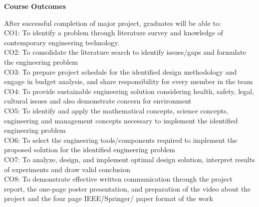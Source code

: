 \begin{titlepage}
\begin{center}
{\Large \textbf{Course Outcomes}}
\end{center}
After successful completion of major project, graduates will be able  to:\\
CO1: To identify a problem through literature survey and knowledge of contemporary engineering technology. \\      
CO2: To consolidate the literature search to identify issues/gaps and formulate the engineering problem \\
CO3: To prepare project schedule for the identified design methodology and engage in budget analysis, and share responsibility for every member in the team\\
CO4: To provide sustainable  engineering solution considering health, safety, legal, cultural issues and also demonstrate concern for environment \\
CO5: To identify and apply the mathematical concepts, science concepts, engineering and management concepts necessary to implement the identified engineering problem \\
CO6: To select the engineering tools/components required to implement the proposed solution for the identified engineering problem\\
CO7: To analyze, design, and implement optimal design solution, interpret results of  experiments and draw valid conclusion \\
CO8: To demonstrate effective written communication through the project report, the one-page poster presentation, and preparation of the video about the project and the four page IEEE/Springer/ paper format of the work\\

\end{titlepage}
